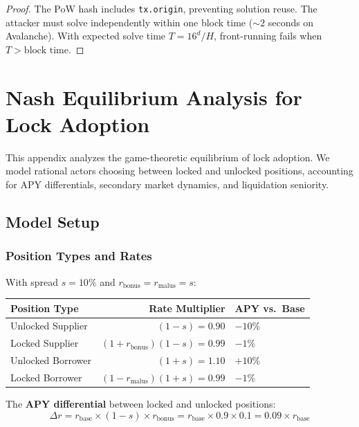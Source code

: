\documentclass[10pt,a4paper,twocolumn]{article}
\theoremstyle{definition}
\theoremstyle{plain}
\theoremstyle{remark}
\begin{document}
\begin{proof}
The PoW hash includes \texttt{tx.origin}, preventing solution reuse. The attacker must solve independently within one block time (${\sim}2$ seconds on Avalanche). With expected solve time $T = 16^d/H$, front-running fails when $T > \text{block time}$.
\end{proof}

\section{Nash Equilibrium Analysis for Lock Adoption}
\label{apx:nash}

This appendix analyzes the game-theoretic equilibrium of lock adoption. We model rational actors choosing between locked and unlocked positions, accounting for APY differentials, secondary market dynamics, and liquidation seniority.

\subsection{Model Setup}

\subsubsection{Position Types and Rates}

With spread $s = 10\%$ and $r_{\text{bonus}} = r_{\text{malus}} = s$:

\begin{center}
\small
\begin{tabularx}{0.95\columnwidth}{@{}l r >{\raggedleft\arraybackslash}X@{}}
\toprule
Position Type & Rate Multiplier & APY vs.\ Base \\
\midrule
Unlocked Supplier & $(1-s) = 0.90$ & $-10\%$ \\
Locked Supplier & $(1+r_{\text{bonus}})(1-s) = 0.99$ & $-1\%$ \\
Unlocked Borrower & $(1+s) = 1.10$ & $+10\%$ \\
Locked Borrower & $(1-r_{\text{malus}})(1+s) = 0.99$ & $-1\%$ \\
\bottomrule
\end{tabularx}
\end{center}

The \textbf{APY differential} between locked and unlocked positions:
\begin{equation}
\Delta r = r_{\text{base}} \times (1-s) \times r_{\text{bonus}} = r_{\text{base}} \times 0.9 \times 0.1 = 0.09 \times r_{\text{base}}
\end{equation}
\end{document}

